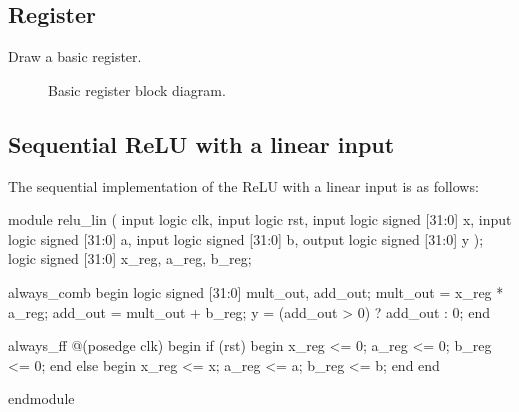 \documentclass[11pt]{article}
\begin{document}
\subsection{Register}

Draw a basic register.


\begin{figure}
  \caption{Basic register block diagram.}
  \label{fig:reg}
  
\end{figure}

\pagebreak
\subsection{Sequential ReLU with a linear input}

The sequential implementation of the ReLU with a linear input is as follows:


\begin{systemverilogcode}
    module relu_lin (
      input logic clk,
      input logic rst,
      input logic signed [31:0] x,
      input logic signed [31:0] a,
      input logic signed [31:0] b,
      output logic signed [31:0] y
    );
      logic signed [31:0] x_reg, a_reg, b_reg;

      always_comb begin
        logic signed [31:0] mult_out, add_out;
        mult_out = x_reg * a_reg;
        add_out = mult_out + b_reg;
        y = (add_out > 0) ? add_out : 0;
      end


      always_ff @(posedge clk) begin
        if (rst) begin
          x_reg <= 0;
          a_reg <= 0;
          b_reg <= 0;
        end else begin
          x_reg <= x;
          a_reg <= a;
          b_reg <= b;
        end
      end
      
    endmodule
  \end{systemverilogcode}
\end{document}
